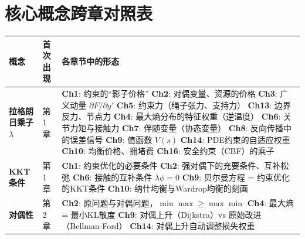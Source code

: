 \section*{核心概念跨章对照表}

\begin{center}
\renewcommand{\arraystretch}{1.6}
\small
\small
\begin{tabular}{@{}p{2.5cm}p{1.9cm}p{7.8cm}@{}}
\toprule
\textbf{概念} & \textbf{首次出现} & \textbf{各章节中的形态} \\
\midrule

\textbf{拉格朗日乘子} $\lambda$
& 第1章
& \textbf{Ch1}: 约束的“影子价格” \newline
  \textbf{Ch2}: 对偶变量、资源的价格 \newline
  \textbf{Ch3}: 广义动量 $\partial F/\partial y'$ \newline
  \textbf{Ch5}: 约束力（绳子张力、支持力） \newline
  \textbf{Ch13}: 边界反力、节点力 \newline
  \textbf{Ch4}: 最大熵分布的特征权重（逆温度） \newline
  \textbf{Ch6}: 关节力矩与接触力 \newline
  \textbf{Ch7}: 伴随变量（协态变量） \newline
  \textbf{Ch8}: 反向传播中的误差信号 \newline
  \textbf{Ch9}: 值函数 $V(s)$ \newline
  \textbf{Ch14}: PDE约束的自适应权重 \newline
  \textbf{Ch10}: 均衡价格、拥堵费 \newline
  \textbf{Ch16}: 安全约束（CBF）的乘子 \\
\midrule

\textbf{KKT条件}
& 第1章
& \textbf{Ch1}: 约束优化的必要条件 \newline
  \textbf{Ch2}: 强对偶下的充要条件、互补松弛 \newline
  \textbf{Ch6}: 接触的互补条件 $\lambda\phi=0$ \newline
  \textbf{Ch9}: 贝尔曼方程 = 约束优化的KKT条件 \newline
  \textbf{Ch10}: 纳什均衡与Wardrop均衡的刻画 \\
\midrule

\textbf{对偶性}
& 第2章
& \textbf{Ch2}: 原问题与对偶问题，$\min\max\ge\max\min$ \newline
  \textbf{Ch4}: 最大熵 = 最小KL散度 \newline
  \textbf{Ch9}: 对偶上升（Dijkstra）vs 原始改进（Bellman-Ford） \newline
  \textbf{Ch14}: 对偶上升自动调整损失权重 \\
\midrule


\end{tabular}
\end{center}
